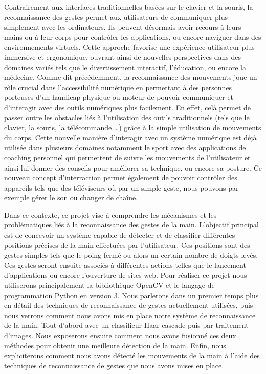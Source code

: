 \documentclass[11pt]{article}
\begin{document}
Contrairement aux interfaces traditionnelles basées sur le clavier et la souris, la reconnaissance des gestes permet aux utilisateurs de communiquer plus simplement avec les ordinateurs. Ils peuvent désormais avoir recours à leurs mains ou à leur corps pour contrôler les applications, ou encore naviguer dans des environnements virtuels. Cette approche favorise une expérience utilisateur plus immersive et ergonomique, ouvrant ainsi de nouvelles perspectives dans des domaines variés tels que le divertissement interactif, l'éducation, ou encore la médecine. Comme dit précédemment, la reconnaissance des mouvements joue un rôle crucial dans l’accessibilité numérique en permettant à des personnes porteuses d'un handicap physique  ou moteur de pouvoir communiquer et d'interagir avec des outils numériques plus facilement. En effet, celà permet de passer outre les obstacles liés à l’utilisation des outils traditionnels (tels que le clavier, la souris, la télécommande …) grâce à la simple utilisation de mouvements du corps. Cette nouvelle manière d'interagir avec un système numérique est déjà utilisée dans plusieurs domaines notamment le sport avec des applications de coaching personnel qui permettent de suivre les mouvements de l'utilisateur et ainsi lui donner des conseils pour améliorer sa technique, ou encore sa posture. Ce nouveau concept d'interraction permet également de pouvoir contrôler des appareils tels que des téléviseurs où par un simple geste, nous pouvons par exemple gérer le son ou changer de chaîne. \vspace{2mm}

Dans ce contexte, ce projet vise à comprendre les mécanismes et les problématiques liés à la reconnaissance des gestes de la main.
L'objectif principal est de concevoir un système capable de détecter et de classifier différentes positions précises de la main effectuées par l'utilisateur.
Ces positions sont des gestes simples tels que le poing fermé ou alors un certain nombre de doigts levés.
Ces gestes seront ensuite associés à différentes actions telles que le lancement d'applications ou encore l'ouverture de sites web.
Pour réaliser ce projet nous utiliserons principalement la bibliothèque OpenCV et le langage de programmation Python en version 3.
Nous parlerons dans un premier temps plus en détail des techniques de reconnaissance de gestes actuellement utilisées, puis nous verrons comment nous avons mis en place notre système de reconnaissance de la main. Tout d'abord avec un classifieur Haar-cascade puis par traitement d'images. Nous exposerons ensuite comment nous avons fusionné ces deux méthodes pour obtenir une meilleure détection de la main. Enfin, nous expliciterons comment nous avons détecté les mouvements de la main à l'aide des techniques de reconnaissance de gestes que nous avons mises en place.
\end{document}
